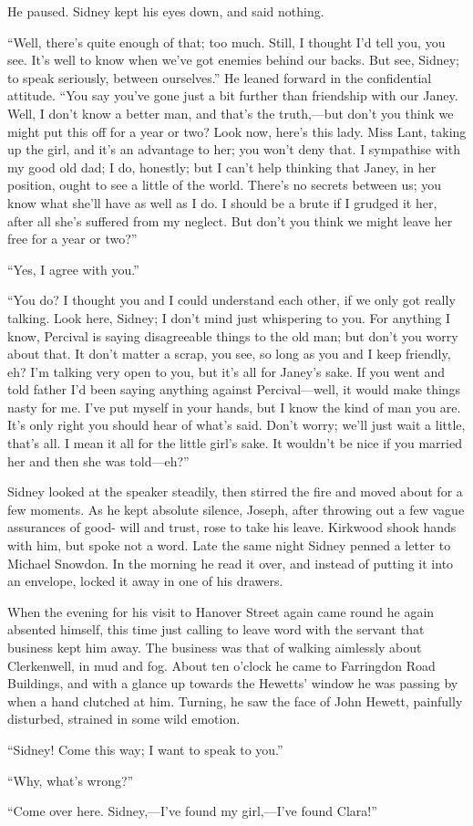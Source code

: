 {\protect\hypertarget{287}{}{}}He paused. Sidney kept his eyes down, and
said nothing.

``Well, there's quite enough of that; too much. Still, I thought I'd
tell you, you see. It's well to know when we've got enemies behind our
backs. But see, Sidney; to speak seriously, between ourselves.'' He
leaned forward in the confidential attitude. ``You say you've gone just
a bit further than friendship with our Janey. Well, I don't know a
better man, and that's the truth,---but don't you think we might put
this off for a year or two? Look now, here's this lady. Miss Lant,
taking up the girl, and it's an advantage to her; you won't deny that. I
sympathise with my good old dad; I do, honestly; but I can't help
thinking that Janey, in her position, ought to see a little of the
world. There's no secrets between us; you know what she'll have as well
as I do. I should be a brute if I grudged it her, after all she's
suffered from my neglect. But don't you think we might leave her free
for a year or two?''

``Yes, I agree with you.''

{\protect\hypertarget{288}{}{}}``You do? I thought you and I could
understand each other, if we only got really talking. Look here, Sidney;
I don't mind just whispering to you. For anything I know, Percival is
saying disagreeable things to the old man; but don't you worry about
that. It don't matter a scrap, you see, so long as you and I keep
friendly, eh? I'm talking very open to you, but it's all for Janey's
sake. If you went and told father I'd been saying anything against
Percival---well, it would make things nasty for me. I've put myself in
your hands, but I know the kind of man you are. It's only right you
should hear of what's said. Don't worry; we'll just wait a little,
that's all. I mean it all for the little girl's sake. It wouldn't be
nice if you married her and then she was told---eh?''

Sidney looked at the speaker steadily, then stirred the fire and moved
about for a few moments. As he kept absolute silence, Joseph, after
throwing out a few vague assurances of good- will and trust, rose to
take his leave. Kirkwood shook hands with him, but spoke
{\protect\hypertarget{289}{}{}}not a word. Late the same night Sidney
penned a letter to Michael Snowdon. In the morning he read it over, and
instead of putting it into an envelope, locked it away in one of his
drawers.

When the evening for his visit to Hanover Street again came round he
again absented himself, this time just calling to leave word with the
servant that business kept him away. The business was that of walking
aimlessly about Clerkenwell, in mud and fog. About ten o'clock he came
to Farringdon Road Buildings, and with a glance up towards the Hewetts'
window he was passing by when a hand clutched at him. Turning, he saw
the face of John Hewett, painfully disturbed, strained in some wild
emotion.

``Sidney! Come this way; I want to speak to you.''

``Why, what's wrong?''

``Come over here. Sidney,---I've found my girl,---I've found Clara!''
